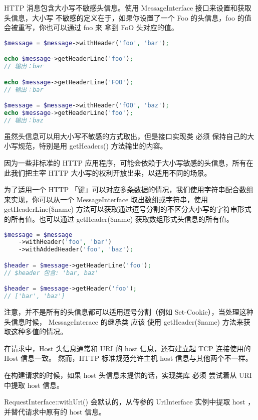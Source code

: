 HTTP 消息包含大小写不敏感头信息。使用 MessageInterface 接口来设置和获取头信息，大小写 不敏感的定义在于，如果你设置了一个 Foo 的头信息，foo 的值会被重写，你也可以通过 foo 来 拿到 FoO 头对应的值。

\begin{lstlisting}[language=PHP]
$message = $message->withHeader('foo', 'bar');

echo $message->getHeaderLine('foo');
// 输出：bar

echo $message->getHeaderLine('FOO');
// 输出：bar

$message = $message->withHeader('fOO', 'baz');
echo $message->getHeaderLine('foo');
// 输出：baz
\end{lstlisting}

虽然头信息可以用大小写不敏感的方式取出，但是接口实现类 必须 保持自己的大小写规范，特别是用 getHeaders() 方法输出的内容。

因为一些非标准的 HTTP 应用程序，可能会依赖于大小写敏感的头信息，所有在此我们把主宰 HTTP 大小写的权利开放出来，以适用不同的场景。

为了适用一个 HTTP 「键」可以对应多条数据的情况，我们使用字符串配合数组来实现，你可以从一个 MessageInterface 取出数组或字符串，使用 getHeaderLine(\$name) 方法可以获取通过逗号分割的不区分大小写的字符串形式的所有值。也可以通过 getHeader(\$name) 获取数组形式头信息的所有值。



\begin{lstlisting}[language=PHP]
$message = $message
    ->withHeader('foo', 'bar')
    ->withAddedHeader('foo', 'baz');

$header = $message->getHeaderLine('foo');
// $header 包含: 'bar, baz'

$header = $message->getHeader('foo');
// ['bar', 'baz']
\end{lstlisting}

注意，并不是所有的头信息都可以适用逗号分割（例如 Set-Cookie），当处理这种头信息时候， MessageInterace 的继承类 应该 使用 getHeader(\$name) 方法来获取这种多值的情况。

在请求中，Host 头信息通常和 URI 的 host 信息，还有建立起 TCP 连接使用的 Host 信息一致。 然而，HTTP 标准规范允许主机 host 信息与其他两个不一样。

在构建请求的时候，如果 host 头信息未提供的话，实现类库 必须 尝试着从 URI 中提取 host 信息。

RequestInterface::withUri() 会默认的，从传参的 UriInterface 实例中提取 host ， 并替代请求中原有的 host 信息。

